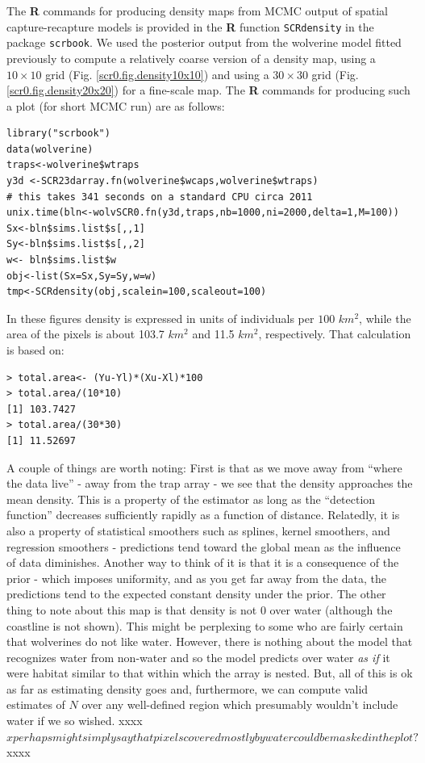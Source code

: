 The {\bf R} commands for producing density maps from MCMC output of
spatial capture-recapture models is provided in the {\bf R} function
\mbox{\tt SCRdensity} in the package \mbox{\tt scrbook}. 
We used the posterior output from the wolverine model fitted previously
to compute a relatively coarse version of a density map, using a $10 \times
10$ grid (Fig. \ref{scr0.fig.density10x10}) and using a $30 \times 30$
grid (Fig. \ref{scr0.fig.density20x20}) for a fine-scale map. The {\bf R} commands for
producing such a plot (for short MCMC run) are as follows:
{\small
\begin{verbatim}
library("scrbook")
data(wolverine)
traps<-wolverine$wtraps
y3d <-SCR23darray.fn(wolverine$wcaps,wolverine$wtraps)
# this takes 341 seconds on a standard CPU circa 2011
unix.time(bln<-wolvSCR0.fn(y3d,traps,nb=1000,ni=2000,delta=1,M=100))
Sx<-bln$sims.list$s[,,1]
Sy<-bln$sims.list$s[,,2]
w<- bln$sims.list$w
obj<-list(Sx=Sx,Sy=Sy,w=w)
tmp<-SCRdensity(obj,scalein=100,scaleout=100)
\end{verbatim}
In these figures density is
expressed in units of individuals per $100$ $km^2$, while the area of
the pixels is about 103.7 $km^2$ and 11.5 $km^2$, respectively. That
calculation is based on:
\begin{verbatim}
> total.area<- (Yu-Yl)*(Xu-Xl)*100
> total.area/(10*10)
[1] 103.7427
> total.area/(30*30)
[1] 11.52697
\end{verbatim}

A couple of things are worth noting: First is that as we move away
from ``where the data live'' - away from the trap array - we see that
the density approaches the mean density. This is a property of the
estimator as long as the ``detection function'' decreases sufficiently
rapidly as a function of distance.
Relatedly, it is also a property of statistical smoothers
such as splines, kernel smoothers, and regression smoothers -
predictions tend toward the global mean as the influence of data
diminishes. Another way to think of it is that it is a consequence of
the prior - which imposes uniformity, and as you get far away from the
data, the predictions tend to the 
expected constant density under the prior.
The other thing to note about
this map is that density is not $0$ over water (although the coastline
is not shown). This might be perplexing
to some who are fairly certain that wolverines do not like
water. However, there is nothing about the model that recognizes water
from non-water and so the model predicts over water {\it as if} it
were habitat similar to that within which the array is nested. But,
all of this is ok as far as estimating density goes and, furthermore,
we can compute valid estimates of $N$ over any well-defined region which
presumably wouldn't include water if we so wished. xxxx$xperhaps might simply say that pixels covered mostly by water could be masked in the plot ?$xxxx

}
